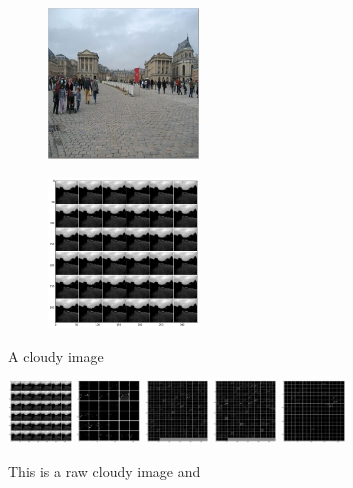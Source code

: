 \graphicspath{ {./Figures/DifferentLayers/} }
\begin{figure}[ht]
    \centering
    \begin{subfigure}[b]{width=0.4}
    \centering\includegraphics[width=4cm]{cloudy1.png}
    \caption{\label{fig:cloudy}}
    \end{subfigure}%
    \begin{subfigure}[b]{width=0.4}
    \centering\includegraphics[width=4cm]{cloudy1_conv1_fm.png}
    \caption{\label{fig:cloudy_conv1}}
    \end{subfigure}%


    \caption{A cloudy image }%
    \includegraphics[width=0.15\textwidth]{cloudy1_conv1_fm.png}
    \includegraphics[width=0.15\textwidth]{cloudy1_conv2_fm.png}
    \includegraphics[width=0.15\textwidth]{cloudy1_conv3_fm.png}
    \includegraphics[width=0.15\textwidth]{cloudy1_conv4_fm.png}
    \includegraphics[width=0.15\textwidth]{cloudy1_conv5_fm.png}
    \caption{This is a raw cloudy image and }%
    \label{fig:finetuneprocess}%
\end{figure}